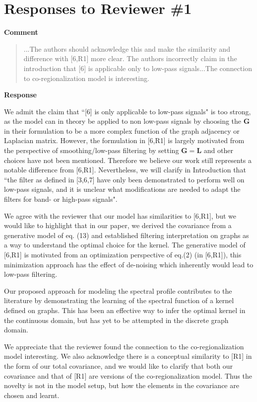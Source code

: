 \documentclass[11pt,onecolumn,journal]{IEEEtran}
\theoremstyle{definition}
\begin{document}
\iffalse
\newpage
\newpage

\section*{Responses to Reviewer \#1}

\textbf{Comment}
\begin{quote}
...The authors should acknowledge this and make the similarity and difference with [6,R1]  more clear. The authors incorrectly claim in the introduction that [6] is applicable only to low-pass signals...The connection to co-regionalization model is interesting.
\end{quote}

\textbf{Response}

We admit the claim that ``[6] is only applicable to low-pass signals" is too strong, as the model can in theory be applied to non low-pass signals by choosing the $\mathbf{G}$ in their formulation to be a more complex function of the graph adjacency or Laplacian matrix. However, the formulation in [6,R1] is largely motivated from the perspective of smoothing/low-pass filtering by setting $\mathbf{G}=\mathbf{L}$ and other choices have not been mentioned. Therefore we believe our work still represents a notable difference from [6,R1]. Nevertheless, we will clarify in Introduction that ``the filter as defined in [3,6,7] have only been demonstrated to perform well on low-pass signals, and it is unclear what modifications are needed to adapt the filters for band- or high-pass signals".

We agree with the reviewer that our model has similarities to [6,R1], but we would like to highlight that in our paper, we derived the covariance from a generative model of eq. (13) and established filtering interpretation on graphs as a way to understand the optimal choice for the kernel. The generative model of [6,R1] is motivated from an optimization perspective of eq.(2) (in [6,R1]), this minimization approach has the effect of de-noising which inherently would lead to low-pass filtering.

Our proposed approach for modeling the spectral profile contributes to the literature by demonstrating the learning of the spectral function of a kernel defined on graphs. This has been an effective way to infer the optimal kernel in the continuous domain, but has yet to be attempted in the discrete graph domain.

We appreciate that the reviewer found the connection to the co-regionalization model interesting. We also acknowledge there is a conceptual similarity to [R1] in the form of our total covariance, and we would like to clarify that both our covariance and that of [R1] are versions of the co-regionalization model. Thus the novelty is not in the model setup, but how the elements in the covariance are chosen and learnt.
\end{document}
